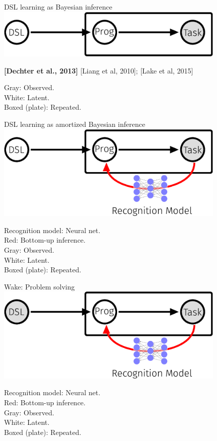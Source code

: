 \documentclass{beamer}
\begin{document}
\begin{frame}[t]{DSL learning as Bayesian inference}
  \includegraphics[width = 11cm]{figures/animation/EC.eps}

\vspace{1cm}
  
  \textbf{[Dechter et al., 2013]}  [Liang et al, 2010]; [Lake et al, 2015]

  \vfill
  Gray: Observed.\\
  White: Latent.\\
  Boxed (plate): Repeated.\\
  
\end{frame}
\begin{frame}[t]{DSL learning as \alert{amortized} Bayesian inference}
  \includegraphics[width = 11cm]{figures/animation/DC.eps}

  \vfill
  Recognition model: Neural net.\\
  Red: Bottom-up inference.\\
  Gray: Observed.\\
  White: Latent.\\
  Boxed (plate): Repeated.\\

\end{frame}
\begin{frame}[t]{Wake: Problem solving}
  \includegraphics[width = 11cm]{figures/animation/Wake.eps}

    \vfill
  Recognition model: Neural net.\\
  Red: Bottom-up inference.\\
  Gray: Observed.\\
  White: Latent.\\
  Boxed (plate): Repeated.\\

\end{frame}
\end{document}
